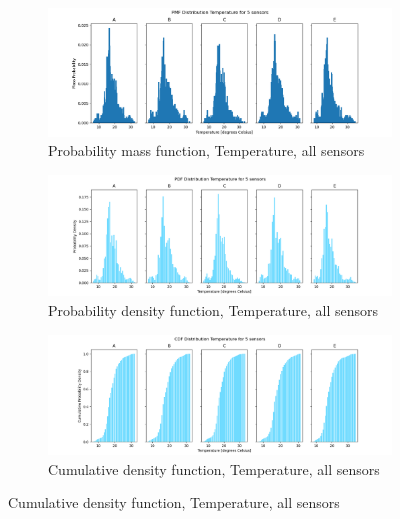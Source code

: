 \documentclass{report}
\begin{document}
	
	\begin{figure}[H]
		\centering
		\begin{subfigure}[b]{\linewidth}
			\includegraphics[width=\linewidth]{GEO1001_hw01_images/GEO1001_hw01_A2_PMF.png}
			\caption{Probability mass function, Temperature, all sensors}
			\label{fig:pmf}
		\end{subfigure}
		
		\begin{subfigure}[b]{\linewidth}
			\includegraphics[width=\linewidth]{GEO1001_hw01_images/GEO1001_hw01_A2_PDF.png}
			\caption{Probability density function, Temperature, all sensors}
			\label{fig:pdf}
		\end{subfigure}
		
		\begin{subfigure}[b]{\linewidth}
			\includegraphics[width=\linewidth]{GEO1001_hw01_images/GEO1001_hw01_A2_CDF.png}
			\caption{Cumulative density function, Temperature, all sensors}
			\label{fig:cdf}
		\end{subfigure}
	\end{figure}
	
\end{document}
